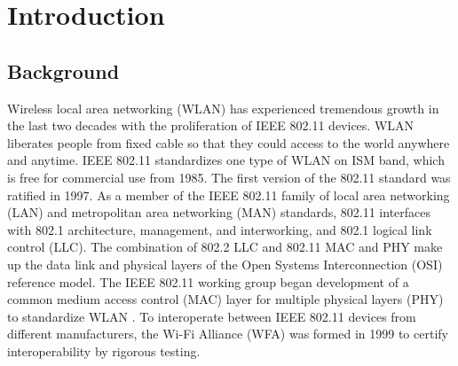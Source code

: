 \chapter{Introduction}  \label{chp_intro}
\section{Background}
Wireless local area networking (WLAN) has experienced tremendous growth in the last two decades with the proliferation of IEEE 802.11 devices. 
WLAN liberates people from fixed cable so that they could access to the world anywhere and anytime. 
IEEE 802.11 standardizes one type of WLAN on ISM band, which is free for commercial use from 1985. 
The first version of the 802.11 standard was ratified in 1997.
As a member of the IEEE 802.11 family of local area networking (LAN) and metropolitan area networking (MAN) standards, 802.11 interfaces with 802.1 architecture, management, and interworking, and 802.1 logical link control (LLC). 
The combination of 802.2 LLC and 802.11 MAC and PHY make up the data link and physical layers of the Open Systems Interconnection (OSI) reference model\cite{osi}.
The IEEE 802.11 working group began development of a common medium access control (MAC) layer for multiple physical layers (PHY) to standardize WLAN \cite{802.11spec}.
To interoperate between IEEE 802.11 devices from different manufacturers, the Wi-Fi Alliance (WFA)\cite{wifialliance} was formed in 1999 to certify interoperability by rigorous testing.

